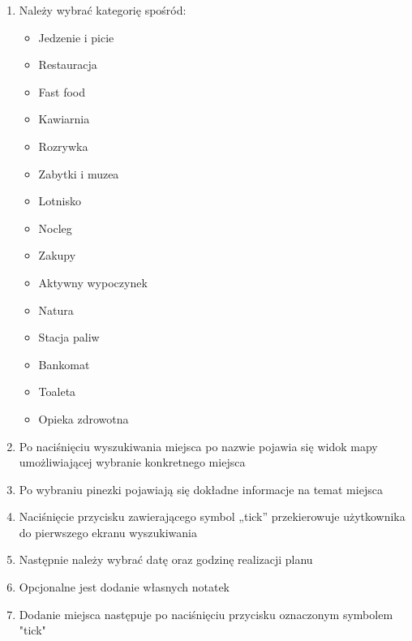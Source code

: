 \documentclass[10pt,twoside,a4paper]{report}
\begin{document}
\begin{enumerate}
\item Należy wybrać kategorię spośród:
\begin{itemize}
\item Jedzenie i picie
\item Restauracja
\item Fast food
\item Kawiarnia
\item Rozrywka
\item Zabytki i muzea
\item Lotnisko
\item Nocleg
\item Zakupy
\item Aktywny wypoczynek
\item Natura
\item Stacja paliw
\item Bankomat
\item Toaleta
\item Opieka zdrowotna
\end{itemize}
\item Po naciśnięciu wyszukiwania miejsca po nazwie pojawia się widok mapy umożliwiającej wybranie konkretnego miejsca
\item Po wybraniu pinezki pojawiają się dokładne informacje na temat miejsca
\item Naciśnięcie przycisku zawierającego symbol „tick” przekierowuje użytkownika do pierwszego ekranu wyszukiwania
\item Następnie należy wybrać datę oraz godzinę realizacji planu
\item Opcjonalne jest dodanie własnych notatek
\item Dodanie miejsca następuje po naciśnięciu przycisku oznaczonym symbolem "tick"
\end{enumerate}
\end{document}
